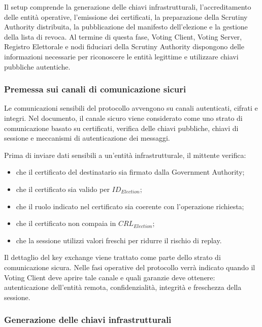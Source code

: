 \documentclass[a4paper,12pt]{article}
\begin{document}
Il setup comprende la generazione delle chiavi infrastrutturali, l'accreditamento delle entit\`a operative, l'emissione dei certificati, la preparazione della Scrutiny Authority distribuita, la pubblicazione del manifesto dell'elezione e la gestione della lista di revoca. 
Al termine di questa fase, Voting Client, Voting Server, Registro Elettorale e nodi fiduciari della Scrutiny Authority dispongono delle informazioni necessarie per riconoscere le entit\`a legittime e utilizzare chiavi pubbliche autentiche.

\subsubsection{Premessa sui canali di comunicazione sicuri}

Le comunicazioni sensibili del protocollo avvengono su canali autenticati, cifrati e integri. 
Nel documento, il canale sicuro viene considerato come uno strato di comunicazione basato su certificati, verifica delle chiavi pubbliche, chiavi di sessione e meccanismi di autenticazione dei messaggi.

Prima di inviare dati sensibili a un'entit\`a infrastrutturale, il mittente verifica:

\begin{itemize}
	\item che il certificato del destinatario sia firmato dalla Government Authority;
	\item che il certificato sia valido per \(ID_{Election}\);
	\item che il ruolo indicato nel certificato sia coerente con l'operazione richiesta;
	\item che il certificato non compaia in \(CRL_{Election}\);
	\item che la sessione utilizzi valori freschi per ridurre il rischio di replay.
\end{itemize}

Il dettaglio del key exchange viene trattato come parte dello strato di comunicazione sicura. 
Nelle fasi operative del protocollo verr\`a indicato quando il Voting Client deve aprire tale canale e quali garanzie deve ottenere: autenticazione dell'entit\`a remota, confidenzialit\`a, integrit\`a e freschezza della sessione.

\subsubsection{Generazione delle chiavi infrastrutturali}
\end{document}
